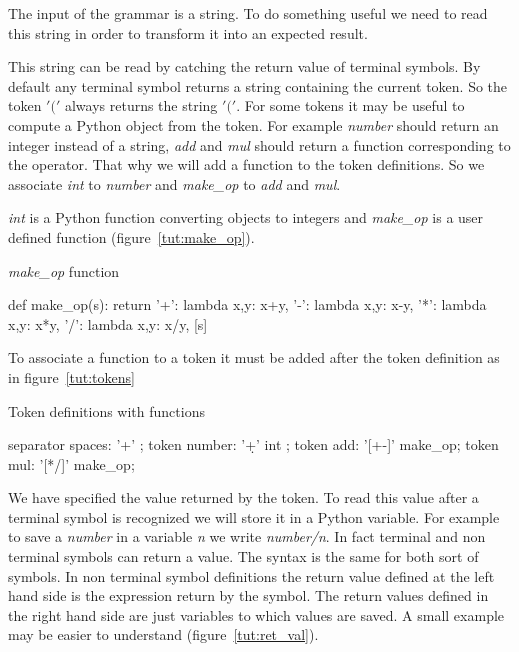The input of the grammar is a string. To do something useful we need to read this string in order to transform it into an expected result.

This string can be read by catching the return value of terminal symbols. By default any terminal symbol returns a string containing the current token. So the token $'('$ always returns the string $'('$. For some tokens it may be useful to compute a Python object from the token. For example \emph{number} should return an integer instead of a string, \emph{add} and \emph{mul} should return a function corresponding to the operator. That why we will add a function to the token definitions. So we associate \emph{int} to \emph{number} and \emph{make\_op} to \emph{add} and \emph{mul}.

\emph{int} is a Python function converting objects to integers and \emph{make\_op} is a user defined function (figure~\ref{tut:make_op}).

\begin{code}
\caption{\emph{make\_op} function}                          \label{tut:make_op}
\begin{verbatimtab}[4]
def make_op(s):
    return {
        '+': lambda x,y: x+y,
        '-': lambda x,y: x-y,
        '*': lambda x,y: x*y,
        '/': lambda x,y: x/y,
    }[s]
\end{verbatimtab}
\end{code}

To associate a function to a token it must be added after the token definition as in figure~\ref{tut:tokens}

\begin{code}
\caption{Token definitions with functions}                  \label{tut:tokens}
\begin{verbatimtab}[4]
    separator spaces: '\s+' ;
    token number: '\d+' int ;
    token add: '[+-]' make_op;
    token mul: '[*/]' make_op;
\end{verbatimtab}
\end{code}

We have specified the value returned by the token. To read this value after a terminal symbol is recognized we will store it in a Python variable. For example to save a \emph{number} in a variable \emph{n} we write \emph{number/n}.
In fact terminal and non terminal symbols can return a value. The syntax is the same for both sort of symbols. In non terminal symbol definitions the return value defined at the left hand side is the expression return by the symbol. The return values defined in the right hand side are just variables to which values are saved. A small example may be easier to understand (figure~\ref{tut:ret_val}).

